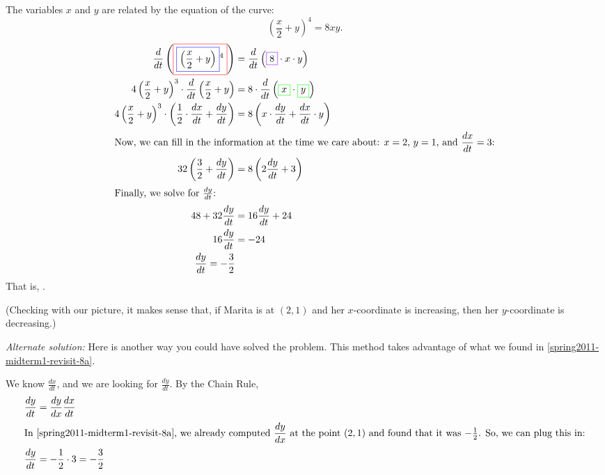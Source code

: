 \documentclass{article}
\begin{document}
\begin{enumerate}
\begin{enumerate}[resume]
\begin{solution}
      The variables $x$ and $y$ are related by the equation of the curve:
      \[ \left( \frac{x}{2} + y \right)^4 = 8xy.\]
      \begin{align*}
        \frac{d}{dt} \left(\fcolorbox{red}{white}{$\displaystyle
            \fcolorbox{blue}{white}{$\displaystyle  \left(\frac{x}{2}+
                y\right)$}^ { 4} $}\right) &= \frac{d}{dt}
        \left(\fcolorbox{purple}{white}{$\displaystyle 8$}\cdot x\cdot
          y\right) \\
        4 \left(\frac{x}{2}+ y\right)^ { 3} \cdot
        \frac{d}{dt}\left(\frac{x}{2}+ y\right) &= 8\cdot \frac{d}{dt}
        \left(\fcolorbox{green}{white}{$\displaystyle  x$}\cdot
          \fcolorbox{green}{white}{$\displaystyle  y$}\right) \\ 
        4 \left(\frac{x}{2}+ y\right)^ { 3} \cdot \left(\frac{1}{2}\cdot
          \frac{dx}{dt}+ \frac{dy}{dt}\right) &= 8 \left(x\cdot
          \frac{dy}{dt}+ \frac{dx}{dt}\cdot y\right) \\
        \intertext{Now, we can fill in the information at the time we care
          about: $x = 2$, $y = 1$, and $\dfrac{dx}{dt} = 3$:}
        32 \left( \frac{3}{2} + \frac{dy}{dt} \right) &= 8 \left( 2
          \frac{dy}{dt} + 3 \right) \\
        \intertext{Finally, we solve for $\frac{dy}{dt}$:}
        48 + 32 \frac{dy}{dt} &= 16 \frac{dy}{dt} + 24 \\
        16 \frac{dy}{dt} &= - 24 \\
        \frac{dy}{dt} = - \frac{3}{2}
      \end{align*}
      That is, .

      (Checking with our picture, it makes sense that, if Marita is at
      $(2, 1)$ and her $x$-coordinate is increasing, then her
      $y$-coordinate is decreasing.)

      \emph{Alternate solution:} Here is another way you could have solved
      the problem.  This method takes advantage of what we found in
      \ref{spring2011-midterm1-revisit-8a}.

      We know $\frac{dx}{dt}$, and we are looking for $\frac{dy}{dt}$.  By
      the Chain Rule,
      \begin{align*}
        \frac{dy}{dt} &= \frac{dy}{dx} \frac{dx}{dt} \\
        \intertext{In \ref{spring2011-midterm1-revisit-8a}, we already
          computed $\dfrac{dy}{dx}$ at the point $(2, 1)$ and found that
          it was $- \frac{1}{2}$.  So, we can plug this in:}
        \frac{dy}{dt} &= - \frac{1}{2} \cdot 3 = - \frac{3}{2}
      \end{align*}
    \end{solution}


\end{enumerate}
\end{enumerate}
\end{document}

